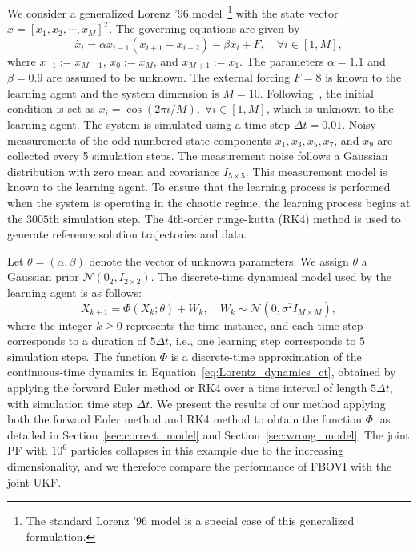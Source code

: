 \documentclass[preprint,3p,times]{elsarticle}
\begin{document}
We consider a generalized Lorenz '96 model~\cite{Lorentz96_generalization}\footnote{The standard Lorenz '96 model is a special case of this generalized formulation.} with the state vector $x=[x_{1},x_{2},\cdots, x_{M}]^T$. The governing equations are given by
\begin{equation}
\dot{x_i} = \alpha x_{i-1}\left(x_{i+1}-x_{i-2}\right)-\beta x_{i}+F, \quad \forall i\in [1,M], 
\label{eq:Lorentz_dynamics_ct}
\end{equation}
where $x_{-1}:=x_{M-1}$, $x_{0}:=x_{M}$, and $x_{M+1}:=x_{1}$. The parameters $\alpha=1.1$ and $\beta=0.9$ are assumed to be unknown. The external forcing $F=8$ is known to the learning agent and the system dimension is $M=10$. Following~\cite{Lorentz96_initial_condition}, the initial condition is set as $x_i = \cos(2\pi i/M), \; \forall i \in [1,M]$, which is unknown to the learning agent. 
The system is simulated using a time step $\Delta t=0.01$. Noisy measurements of the odd-numbered state components $x_1,x_3,x_5,x_7$, and $x_9$ are collected every 5 simulation steps. The measurement noise follows a Gaussian distribution with zero mean and covariance $I_{5\times5}$. This measurement model is known to the learning agent. To ensure that the learning process is performed when the system is operating in the chaotic regime, the learning process begins at the $3005$th simulation step. The 4th-order runge-kutta (RK4) method is used to generate reference solution trajectories and data.


 Let $\theta = (\alpha, \beta)$ denote the vector of unknown parameters. We assign $\theta$ a Gaussian prior $\mathcal{N}(0_2, I_{2\times2})$. The discrete-time dynamical model used by the learning agent is as follows:
\begin{equation}
X_{k+1} = \Phi(X_k; \theta) + W_k, \quad W_k \sim \mathcal{N}(0, \sigma^2 I_{M \times M}),
\label{eq:learning_model}
\end{equation}
where the integer $k \geq 0$ represents the time instance, and each time step corresponds to a duration of $5\Delta t$, i.e., one learning step corresponds to $5$ simulation steps. The function $\Phi$ is a discrete-time approximation of the continuous-time dynamics in Equation~\eqref{eq:Lorentz_dynamics_ct}, obtained by applying the forward Euler method or RK4 over a time interval of length $5\Delta t$, with simulation time step $\Delta t$. We present the results of our method applying both the forward Euler method and RK4 method to obtain the function $\Phi$, as detailed in Section~\ref{sec:correct_model} and Section~\ref{sec:wrong_model}. The joint PF with $10^6$ particles collapses in this example due to the increasing dimensionality, and we therefore compare the performance of FBOVI with the joint UKF.
\end{document}
